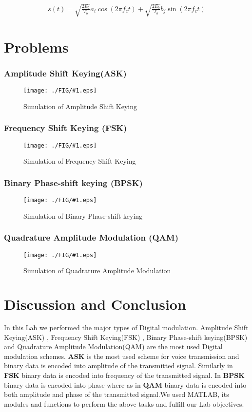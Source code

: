 \documentclass[a4paper,11pt]{article}
\newcommand{\mobs}[2]{
    \begin{figure}[H]
        \centering
        \texttt{[image: ./FIG/\#1.eps]}
        \caption{#2}
    \end{figure}
   
}
\begin{document}
\def\samp { \sqrt{\frac{2E_b}{T_b}} }

\begin{align*}
    s(t) = \samp a_i \cos{(2\pi f_c t)} + \samp b_j \sin{(2\pi f_c t)}
\end{align*}





\pagebreak
\section{Problems}

\subsubsection{Amplitude Shift Keying(ASK)}
\mobs{ASK}{Simulation of Amplitude Shift Keying}


\subsubsection{Frequency Shift Keying (FSK)}
\mobs{FSK}{Simulation of Frequency Shift Keying}



\subsubsection{Binary Phase-shift keying (BPSK)}
\mobs{BPSK}{Simulation of Binary Phase-shift keying}



\subsubsection{Quadrature Amplitude Modulation (QAM)}
\mobs{QAM}{Simulation of Quadrature Amplitude Modulation}



\section{Discussion and Conclusion}
In this Lab we performed the major types of Digital modulation. Amplitude Shift Keying(ASK) , Frequency Shift Keying(FSK) , Binary Phase-shift keying(BPSK) and Quadrature Amplitude Modulation(QAM) are the most used Digital modulation schemes. \textbf{ASK} is the most used scheme for voice transmission and binary data is encoded into amplitude of the transmitted signal. Similarly in \textbf{FSK} binary data is encoded into frequency of the transmitted signal. In \textbf{BPSK} binary data is encoded into phase where as in \textbf{QAM}  binary data is encoded into both amplitude and phase of the transmitted signal.We used MATLAB, its modules and functions to perform the above tasks and fulfill our Lab objectives.
\end{document}
